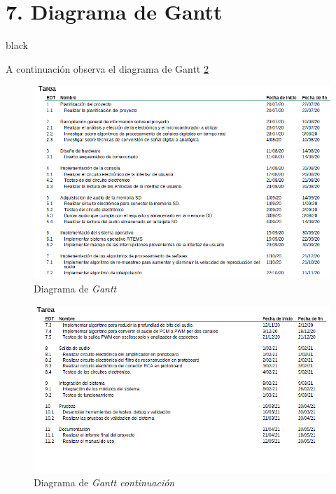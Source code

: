 \documentclass[11pt]{charter}
\begin{document}
\section{7. Diagrama de Gantt}
\label{sec:gantt}
\begin{consigna}{black}

A continuación observa el diagrama de Gantt \ref{fig:gant1}

\begin{figure}[htpb]
\centering 
\includegraphics[width=1.1\textwidth]{./Figuras/gant1.png}
\caption{Diagrama de \textit{Gantt}}
\label{fig:gant1}
\end{figure}

\begin{figure}[htpb]
\centering 
\includegraphics[width=1.1\textwidth]{./Figuras/gant2.png}
\caption{Diagrama de \textit{Gantt continuación}}
\label{fig:gant1}
\end{figure}


\end{consigna}
\end{document}
